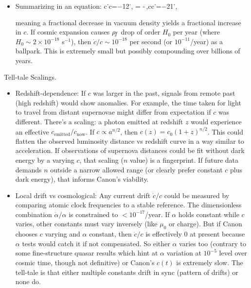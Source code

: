 \documentclass[11pt]{article}
\begin{document}
\begin{itemize}
\item 
Summarizing in an equation: c˙c=−12\rhoF˙\rhoF, = -\frac{\dot{\rhoF}}{\rhoF}\,,cc˙=−21\rhoF\rhoF˙,

meaning a fractional decrease in vacuum density yields a fractional increase in $c$. If cosmic expansion causes $\rho_{\!f}$ drop of order $H_0$ per year (where $H_0 \sim 2\times10^{-18}$ s$^{-1}$), then $\dot{c}/c \sim 10^{-18}$ per second (or $10^{-11}$/year) as a ballpark. This is extremely small but possibly compounding over billions of years.




\end{itemize}

Tell-tale Scalings.


\begin{itemize}

\item 
Redshift-dependence: If $c$ was larger in the past, signals from remote past (high redshift) would show anomalies. For example, the time taken for light to travel from distant supernovae might differ from expectation if $c$ was different. There’s a scaling: a photon emitted at redshift $z$ would experience an effective $c_{\text{emitted}}/c_{\text{now}}$. If $c \propto a^{n/2}$, then $c(z) = c_0 (1+z)^{n/2}$. This could flatten the observed luminosity distance vs redshift curve in a way similar to acceleration. If observations of supernova distances could be fit without dark energy by a varying $c$, that scaling ($n$ value) is a fingerprint. If future data demands $n$ outside a narrow allowed range (or clearly prefer constant $c$ plus dark energy), that informs Canon’s viability.




\item 
Local drift vs cosmological: Any current drift $\dot{c}/c$ could be measured by comparing atomic clock frequencies to a stable reference. The dimensionless combination $\dot{\alpha}/\alpha$ is constrained to $<10^{-17}$/year. If $\alpha$ holds constant while $c$ varies, other constants must vary inversely (like $\mu_0$ or charge). But if Canon chooses $c$ varying and $\alpha$ constant, then $\dot{c}/c$ is effectively 0 at present because $\alpha$ tests would catch it if not compensated. So either $\alpha$ varies too (contrary to some fine-structure quasar results which hint at $\alpha$ variation at $10^{-5}$ level over cosmic time, though not definitive) or Canon’s $c(t)$ is extremely slow. The tell-tale is that either multiple constants drift in sync (pattern of drifts) or none do.





\end{itemize}
\end{document}
